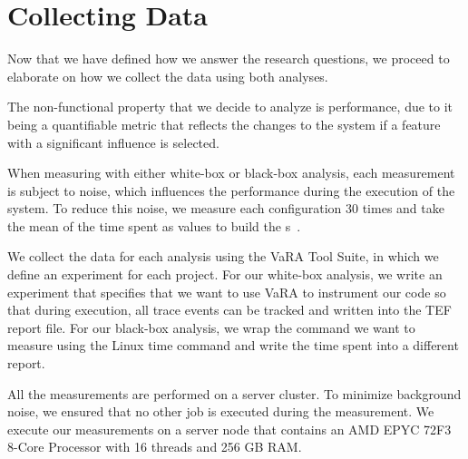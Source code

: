 \section{Collecting Data}\label{ch:collect-data}
Now that we have defined how we answer the research questions, we proceed to elaborate on how we collect the data using both analyses.

The non-functional property that we decide to analyze is performance, due to it being a quantifiable metric
that reflects the changes to the system if a feature with a significant influence is selected.

When measuring with either white-box or black-box analysis, 
each measurement is subject to noise, which influences the performance during the execution of the system. 
To reduce this noise, we measure each configuration 30 times and take the mean of the time spent as values to build the {\perfInfluenceModel}s~\cite{SampleSize}.

We collect the data for each analysis using the VaRA Tool Suite, in which we define an experiment for each project. 
For our white-box analysis, we write an experiment that specifies that we want to use VaRA to instrument our code so that during execution, 
all trace events can be tracked and written into the TEF report file. For our black-box analysis, 
we wrap the command we want to measure using the Linux time command and write the time spent into a different report. 

All the measurements are performed on a server cluster. To minimize background noise, we ensured that no other job is executed during the measurement. 
We execute our measurements on a server node that contains an AMD EPYC 72F3 8-Core Processor with 16 threads and 256 GB RAM.

